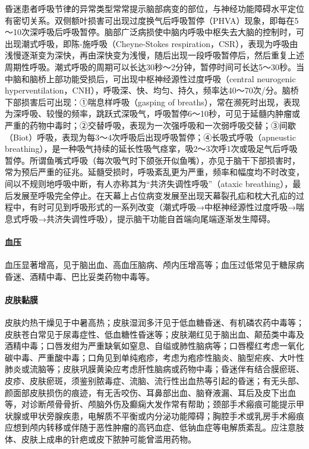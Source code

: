 昏迷患者呼吸节律的异常类型常常提示脑部病变的部位，与神经功能障碍水平定位有密切关系。双侧额叶损害可出现过度换气后呼吸暂停（PHVA）现象，即每在5～10次深呼吸后呼吸暂停。脑部广泛病损使中脑内呼吸中枢失去大脑的控制时，可出现潮式呼吸，即陈-施呼吸（Cheyne-Stokes
respiration，CSR），表现为呼吸由浅慢逐渐变为深快，再由深快变为浅慢，随后出现一段呼吸暂停后，然后重复上述周期性呼吸。潮式呼吸的周期可以长达30秒～2分钟，暂停时间可长达5～30秒。当中脑和脑桥上部功能受损后，可出现中枢神经源性过度呼吸（central
neurogenic
hyperventilation，CNH），呼吸深、快、均匀、持久，频率达40～70次/分。脑桥下部损害后可出现：①喘息样呼吸（gasping
of
breaths），常在濒死时出现，表现为深呼吸、较慢的频率，跳跃式深吸气，呼吸暂停6～10秒，可见于延髓内肿瘤或严重的药物中毒时；②交替呼吸，表现为一次强呼吸和一次弱呼吸交替；③间歇（Biot）呼吸，表现为每3～4次呼吸后出现呼吸暂停；④长吸式呼吸（apneustic
breathing），是一种吸气持续的延长性吸气痉挛，吸2～3次呼1次或吸足气后呼吸暂停。所谓鱼嘴式呼吸（每次吸气时下颌张开似鱼嘴），亦见于脑干下部损害时，常为预后严重的征兆。延髓受损时，呼吸紊乱更为严重，频率和幅度均不时改变，间以不规则地呼吸中断，有人亦称其为“共济失调性呼吸”（ataxic
breathing），最后发展至呼吸完全停止。在天幕上占位病变发展至出现天幕裂孔疝和枕大孔疝的过程中，有时可见到呼吸形式的一系列改变（潮式呼吸→中枢神经源性过度呼吸→喘息式呼吸→共济失调性呼吸），提示脑干功能自首端向尾端逐渐发生障碍。

\paragraph{血压}

血压显著增高，见于脑出血、高血压脑病、颅内压增高等；血压过低常见于糖尿病昏迷、酒精中毒、巴比妥类药物中毒等。

\paragraph{皮肤黏膜}

皮肤灼热干燥见于中暑高热；皮肤湿润多汗见于低血糖昏迷、有机磷农药中毒等；皮肤苍白常见于尿毒症性、低血糖性昏迷等；皮肤潮红见于脑出血、颠茄类中毒及酒精中毒；口唇发绀为严重缺氧如窒息、自缢或肺性脑病等；口唇樱红考虑一氧化碳中毒、严重酸中毒；口角见到单纯疱疹，考虑为疱疹性脑炎、脑型疟疾、大叶性肺炎或流脑等；皮肤巩膜黄染应考虑肝性脑病或药物中毒；昏迷伴有结合膜瘀斑、皮疹、皮肤瘀斑，须鉴别脓毒症、流脑、流行性出血热等引起的昏迷；有无头部、颜面部皮肤损伤的痕迹，有无舌咬伤、耳鼻部出血、脑脊液漏、耳后及皮下出血等，对诊断颅骨骨折、颅脑外伤及癫痫大发作常有帮助；颈部手术瘢痕可能提示甲状腺或甲状旁腺疾患，电解质不平衡或内分泌功能障碍；胸腔手术或乳房手术瘢痕应想到颅内转移或伴随于恶性肿瘤的高钙血症、低钠血症等电解质紊乱。应注意肢体、皮肤上成串的针疤或皮下脓肿可能曾滥用药物。

